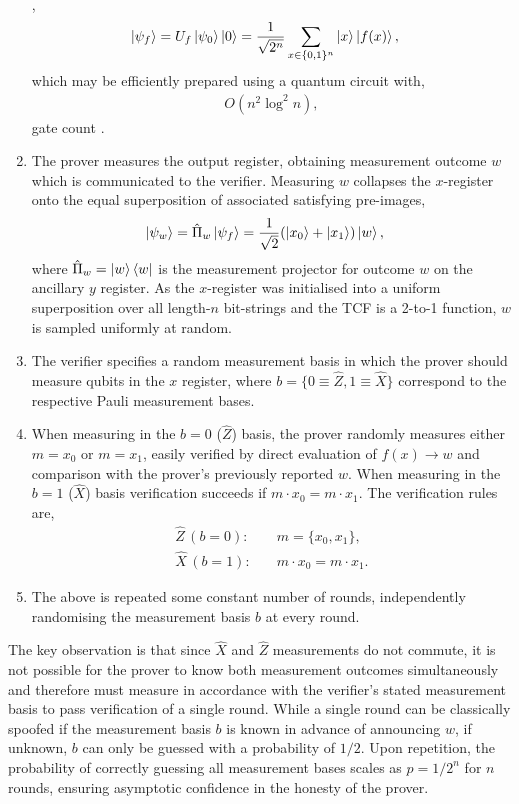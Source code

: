 \begin{enumerate}
{\begin{align}
		      \end{align}},
	      \begin{align}
		      \ket{\psi_f} &= U_f \ket{\psi_0}\ket{0} = \frac{1}{\sqrt{2^n}} \sum_{x\in\{0,1\}^n} \ket{x} \ket{f(x)},
	      \end{align}
	      which may be efficiently prepared using a quantum circuit with,
	      \begin{align}
		      O(n^2 \log^2 n),
	      \end{align}
	      gate count \cite{ClassVerifQA}.
	\item The prover measures the output register, obtaining measurement outcome $w$ which is communicated to the verifier. Measuring $w$ collapses the $x$-register onto the equal superposition of associated satisfying pre-images,
	      \begin{align}
		      \ket{\psi_w} &= \hat\Pi_w \ket{\psi_f} = \frac{1}{\sqrt{2}}(\ket{x_0}+\ket{x_1})\ket{w},
	      \end{align}
	      where $\hat\Pi_w=\ket{w}\bra{w}$ is the measurement projector for outcome $w$ on the ancillary $y$ register.
	      As the $x$-register was initialised into a uniform superposition over all length-$n$ bit-strings and the TCF is a 2-to-1 function, $w$ is sampled uniformly at random.
	\item The verifier specifies a random measurement basis in which the prover should measure qubits in the $x$ register, where $b=\{0\equiv \hat{Z},1\equiv\hat{X} \}$ correspond to the respective Pauli measurement bases.
	\item When measuring in the $b=0$ ($\hat{Z}$) basis, the prover randomly measures either $m=x_0$ or $m=x_1$, easily verified by direct evaluation of \mbox{$f(x)\to w$} and comparison with the prover's previously reported $w$. When measuring in the $b=1$ ($\hat{X}$) basis verification succeeds if \mbox{$m\cdot x_0 = m\cdot x_1$}. The verification rules are,
	      \begin{align}
		      \hat{Z}\, (b=0): & \quad m=\{x_0,x_1\},\nonumber  \\
		      \hat{X}\, (b=1): & \quad m\cdot x_0 = m\cdot x_1.
	      \end{align}
	\item The above is repeated some constant number of rounds, independently randomising the measurement basis $b$ at every round.
\end{enumerate}

The key observation is that since $\hat{X}$ and $\hat{Z}$ measurements do not commute, it is not possible for the prover to know both measurement outcomes simultaneously and therefore must measure in accordance with the verifier's stated measurement basis to pass verification of a single round. While a single round can be classically spoofed if the measurement basis $b$ is known in advance of announcing $w$, if unknown, $b$ can only be guessed with a probability of $1/2$. Upon repetition, the probability of correctly guessing all measurement bases scales as \mbox{$p=1/2^n$} for $n$ rounds, ensuring asymptotic confidence in the honesty of the prover.


